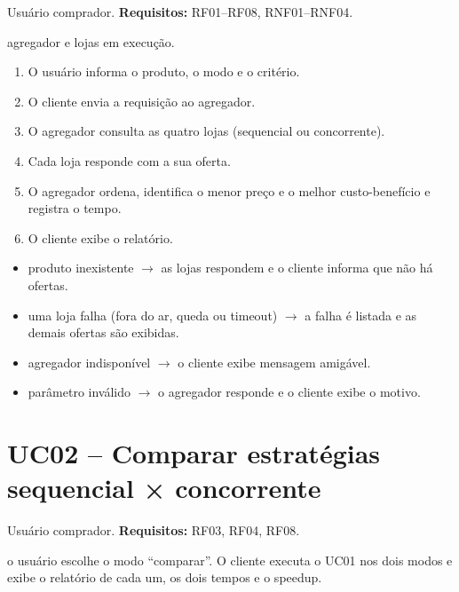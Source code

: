 \begin{description}[leftmargin=0pt, labelsep=0.4em, itemsep=0.15em]
  \item[Ator:] Usuário comprador. \textbf{Requisitos:} RF01--RF08, RNF01--RNF04.
  \item[Pré-condição:] agregador e lojas em execução.
  \item[Fluxo principal:]\leavevmode
  \begin{enumerate}
    \item O usuário informa o produto, o modo e o critério.
    \item O cliente envia a requisição  ao agregador.
    \item O agregador consulta as quatro lojas (sequencial ou concorrente).
    \item Cada loja responde com a sua oferta.
    \item O agregador ordena, identifica o menor preço e o melhor custo-benefício e registra o tempo.
    \item O cliente exibe o relatório.
  \end{enumerate}
  \item[Fluxos alternativos:]\leavevmode
  \begin{itemize}
    \item[A1:] produto inexistente $\rightarrow$ as lojas respondem  e o cliente informa que não há ofertas.
    \item[A2:] uma loja falha (fora do ar, queda ou timeout) $\rightarrow$ a falha é listada e as demais ofertas são exibidas.
    \item[A3:] agregador indisponível $\rightarrow$ o cliente exibe mensagem amigável.
    \item[A4:] parâmetro inválido $\rightarrow$ o agregador responde  e o cliente exibe o motivo.
  \end{itemize}
\end{description}

\section{UC02 -- Comparar estratégias sequencial × concorrente}

\begin{description}[leftmargin=0pt, labelsep=0.4em, itemsep=0.15em]
  \item[Ator:] Usuário comprador. \textbf{Requisitos:} RF03, RF04, RF08.
  \item[Fluxo:] o usuário escolhe o modo ``comparar''. O cliente executa o UC01 nos dois modos e exibe o relatório de cada um, os dois tempos e o speedup.
\end{description}

